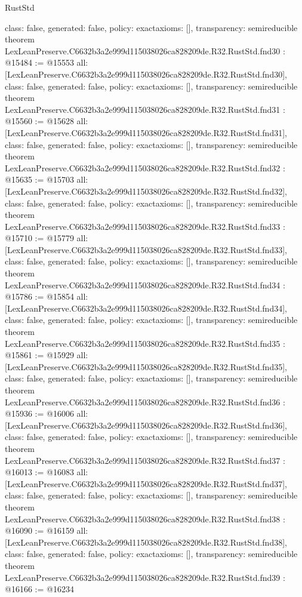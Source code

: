 \begin{lexlean}{RustStd}
\begin{coremodule}
{  class: false,
  generated: false,
  policy: exact{axioms: []},
  transparency: semireducible
}
theorem LexLeanPreserve.C6632b3a2e999d115038026ca828209de.R32.RustStd.fnd30 : @15484 := @15553 {
  all: [LexLeanPreserve.C6632b3a2e999d115038026ca828209de.R32.RustStd.fnd30],
  class: false,
  generated: false,
  policy: exact{axioms: []},
  transparency: semireducible
}
theorem LexLeanPreserve.C6632b3a2e999d115038026ca828209de.R32.RustStd.fnd31 : @15560 := @15628 {
  all: [LexLeanPreserve.C6632b3a2e999d115038026ca828209de.R32.RustStd.fnd31],
  class: false,
  generated: false,
  policy: exact{axioms: []},
  transparency: semireducible
}
theorem LexLeanPreserve.C6632b3a2e999d115038026ca828209de.R32.RustStd.fnd32 : @15635 := @15703 {
  all: [LexLeanPreserve.C6632b3a2e999d115038026ca828209de.R32.RustStd.fnd32],
  class: false,
  generated: false,
  policy: exact{axioms: []},
  transparency: semireducible
}
theorem LexLeanPreserve.C6632b3a2e999d115038026ca828209de.R32.RustStd.fnd33 : @15710 := @15779 {
  all: [LexLeanPreserve.C6632b3a2e999d115038026ca828209de.R32.RustStd.fnd33],
  class: false,
  generated: false,
  policy: exact{axioms: []},
  transparency: semireducible
}
theorem LexLeanPreserve.C6632b3a2e999d115038026ca828209de.R32.RustStd.fnd34 : @15786 := @15854 {
  all: [LexLeanPreserve.C6632b3a2e999d115038026ca828209de.R32.RustStd.fnd34],
  class: false,
  generated: false,
  policy: exact{axioms: []},
  transparency: semireducible
}
theorem LexLeanPreserve.C6632b3a2e999d115038026ca828209de.R32.RustStd.fnd35 : @15861 := @15929 {
  all: [LexLeanPreserve.C6632b3a2e999d115038026ca828209de.R32.RustStd.fnd35],
  class: false,
  generated: false,
  policy: exact{axioms: []},
  transparency: semireducible
}
theorem LexLeanPreserve.C6632b3a2e999d115038026ca828209de.R32.RustStd.fnd36 : @15936 := @16006 {
  all: [LexLeanPreserve.C6632b3a2e999d115038026ca828209de.R32.RustStd.fnd36],
  class: false,
  generated: false,
  policy: exact{axioms: []},
  transparency: semireducible
}
theorem LexLeanPreserve.C6632b3a2e999d115038026ca828209de.R32.RustStd.fnd37 : @16013 := @16083 {
  all: [LexLeanPreserve.C6632b3a2e999d115038026ca828209de.R32.RustStd.fnd37],
  class: false,
  generated: false,
  policy: exact{axioms: []},
  transparency: semireducible
}
theorem LexLeanPreserve.C6632b3a2e999d115038026ca828209de.R32.RustStd.fnd38 : @16090 := @16159 {
  all: [LexLeanPreserve.C6632b3a2e999d115038026ca828209de.R32.RustStd.fnd38],
  class: false,
  generated: false,
  policy: exact{axioms: []},
  transparency: semireducible
}
theorem LexLeanPreserve.C6632b3a2e999d115038026ca828209de.R32.RustStd.fnd39 : @16166 := @16234 {
}
\end{coremodule}
\end{lexlean}
